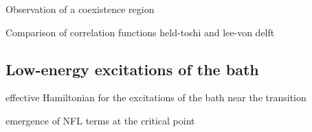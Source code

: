 \documentclass[8pt,aspectratio=169]{beamer}
\begin{document}
\begin{frame}{Observation of a coexistence region}
{\vspace*{\fill}
\begin{center}
\end{center}
}
\end{frame}


\begin{frame}{Comparison of correlation functions}
held-toshi and lee-von delft
\end{frame}

\begin{frame}{}
\section{Low-energy excitations of the bath}
\end{frame}
\begin{frame}{effective Hamiltonian for the excitations of the bath near the transition}
\end{frame}
\begin{frame}{emergence of NFL terms at the critical point}
\end{frame}
\end{document}
